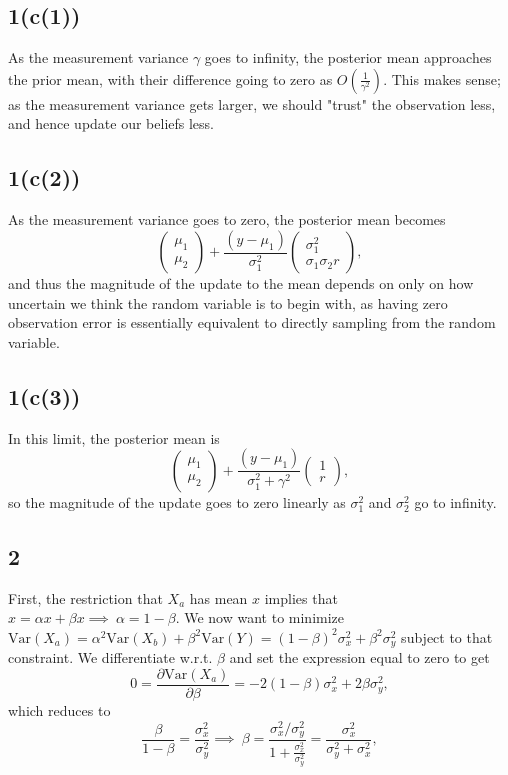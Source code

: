 \documentclass[11pt]{article}
\begin{document}
\subsection*{1(c(1))} As the measurement variance $\gamma$ goes to infinity, the posterior mean approaches the prior mean, with their difference going to zero as $O(\frac{1}{\gamma^2})$. This makes sense; as the measurement variance gets larger, we should "trust" the observation less, and hence update our beliefs less. 
\subsection*{1(c(2))} As the measurement variance goes to zero, the posterior mean becomes
\[
\begin{pmatrix}\mu_1 \\ \mu_2 \end{pmatrix} + \dfrac{(y-\mu_1)}{\sigma_1^2} \begin{pmatrix}\sigma_1^2 \\ \sigma_1\sigma_2 r\end{pmatrix},
\]
and thus the magnitude of the update to the mean depends on only on how uncertain we think the random variable is to begin with, as having zero observation error is essentially equivalent to directly sampling from the random variable.

\subsection*{1(c(3))} In this limit, the posterior mean is 
\[
\begin{pmatrix}\mu_1 \\ \mu_2 \end{pmatrix} + \dfrac{(y-\mu_1)}{\sigma_1^2 + \gamma^2} \begin{pmatrix}1 \\ r\end{pmatrix},
\]
so the magnitude of the update goes to zero linearly as $\sigma_1^2$ and $\sigma_2^2$ go to infinity.

\subsection*{2} First, the restriction that $X_a$ has mean $x$ implies that $x = \alpha x + \beta x\implies \ \alpha = 1-\beta.$ We now want to minimize $\mathrm{Var}(X_a) = \alpha^2 \mathrm{Var}(X_b) + \beta^2 \mathrm{Var}(Y) = (1-\beta)^2\sigma_x^2 + \beta^2\sigma_y^2$ subject to that constraint. We differentiate w.r.t. $\beta$ and set the expression equal to zero to get
\[
0 = \dfrac{\partial\mathrm{Var}(X_a)}{\partial\beta} = -2(1-\beta)\sigma_x^2 + 2\beta\sigma_y^2,
\]
which reduces to 
\[
\dfrac{\beta}{1-\beta} = \dfrac{\sigma_x^2}{\sigma_y^2} \implies \ \beta = \dfrac{\sigma_x^2/ \sigma_y^2}{1+\frac{\sigma_x^2}{\sigma_y^2}} = \dfrac{\sigma_x^2}{\sigma_y^2 + \sigma_x^2},
\]
\end{document}
